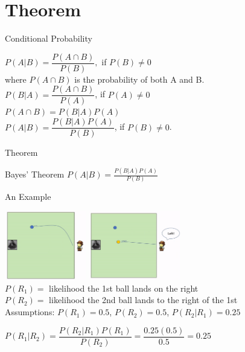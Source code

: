 \documentclass[article]{beamer}
\begin{document}
\section{Theorem}  %
\begin{frame}{Conditional Probability}
\begin{center}
$P(A|B)=\dfrac{P(A\cap B)}{P(B)},$ if $P(B)\neq 0$ \\
where $P(A\cap B)$ is the probability of both A and B. \\
\vspace{1cm}
$P(B|A)=\dfrac{P(A\cap B)}{P(A)}$, if $P(A)\neq 0$ \\
\vspace{1cm}
    $P(A\cap B)= P(B|A)P(A)$ \\
\vspace{1cm}
    \large $P(A|B)=\dfrac{P(B|A)P(A)}{P(B)}$, if $P(B)\neq 0$.
\end{center}
\end{frame}
\begin{frame}{Theorem}

\begin{block}{Bayes' Theorem}
$P(A|B) = \frac{P(B|A)P(A)}{P(B)}$
\end{block}

\end{frame}

\begin{frame}{An Example}
\begin{center}
\includegraphics[height=3cm]{first.png} 
\includegraphics[height=3cm]{left.png} \\
$P(R_1)=$ likelihood the 1st ball lands on the right   \\
$P(R_2)=$ likelihood the 2nd ball lands to the right of the 1st\\
Assumptions: $P(R_1)=0.5$, $P(R_2)=0.5$, $P(R_2|R_1)=0.25$\\
\vspace{1 cm}

 $P(R_1|R_2)=\dfrac{P(R_2|R_1)P(R_1)}{P(R_2)} =\dfrac{0.25(0.5)}{0.5}=0.25$ 
\end{center}
\end{frame}
\end{document}
